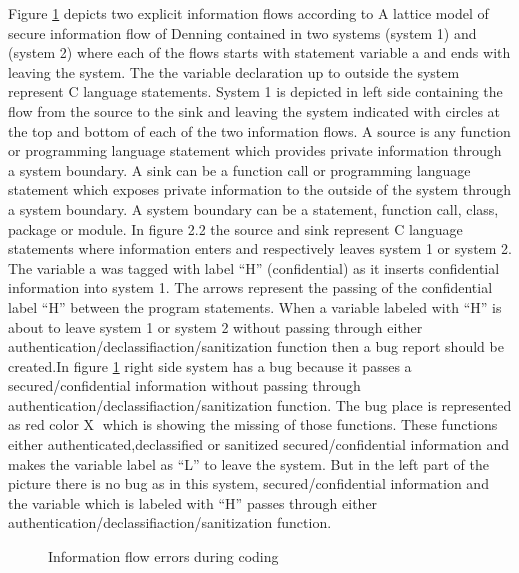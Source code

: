 Figure \ref{figure_bug_detection_during_coding} depicts two explicit information flows according to A lattice model of secure information flow of Denning \cite{ref_14_denning1976lattice} contained in two systems (system 1) and (system 2)
where each of the flows starts with statement variable a and ends with leaving the system. The the variable declaration up to outside the system represent C language statements. System 1 is depicted in left side containing the flow from the source to the sink and leaving the system indicated with circles at the top and bottom of each of the
two information flows. A source is any function or programming language statement which provides private information through a system boundary. A sink can be a function call or programming language statement which exposes private information to the outside of the system through a system boundary. A system boundary can be a statement, function call, class, package or module. In figure 2.2 the source and sink represent C language statements where information enters and respectively leaves system 1 or system 2. The variable a was tagged with label \enquote{H} (confidential) as it inserts confidential information into system 1. The arrows represent the passing of the confidential label \enquote{H} between the program statements. When a variable labeled with \enquote{H} is about to leave system 1 or system 2 without passing through either authentication/declassifiaction/sanitization function then a bug report should be created.In figure \ref{figure_bug_detection_during_coding} right side system has a bug because it passes a secured/confidential information without passing through authentication/declassifiaction/sanitization function. The bug place is represented as red color \textcircled{X} which is showing the missing of those functions. These functions either authenticated,declassified or sanitized  secured/confidential information and makes the variable label as \enquote{L} to leave the system. But in the left part of the picture there is no bug as in this system, secured/confidential information and the variable which is labeled with \enquote{H} passes through either authentication/declassifiaction/sanitization function.

\begin{figure}[htbp]
	\centering
	\caption{Information flow errors during coding}
	\label{figure_bug_detection_during_coding}
\end{figure}
